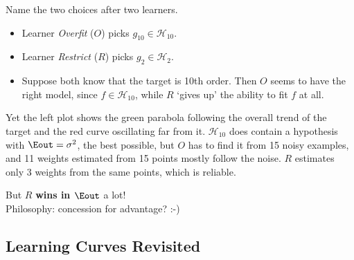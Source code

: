 Name the two choices after two learners.
\begin{itemize}
    \item Learner \emph{Overfit} (\(O\)) picks \(g_{10} \in
        \mathcal{H}_{10}\).
    \item Learner \emph{Restrict} (\(R\)) picks \(g_2 \in \mathcal{H}_2\).
    \item Suppose both know that the target is 10th order. Then \(O\) seems to
        have the right model, since \(f \in \mathcal{H}_{10}\), while \(R\)
        `gives up' the ability to fit \(f\) at all.
\end{itemize}
Yet the left plot shows the green parabola following the overall trend of the
target and the red curve oscillating far from it. \(\mathcal{H}_{10}\) does
contain a hypothesis with \(\Eout = \sigma^2\), the best possible, but \(O\)
has to find it from 15 noisy examples, and 11 weights estimated from 15 points
mostly follow the noise. \(R\) estimates only 3 weights from the same points,
which is reliable.

\begin{moral}
    But \(R\) \textbf{wins in \(\Eout\)} a lot!\\
    Philosophy: concession for advantage? :-)
\end{moral}

\subsection{Learning Curves Revisited}

